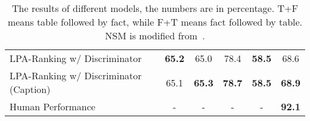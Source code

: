 \documentclass{article} \usepackage{iclr2020_conference,times}
\begin{document}
\begin{table*}[thb]
\begin{tabular}{lccccc}
LPA-Ranking w/ Discriminator          & \textbf{65.2}                    & 65.0                 &  78.4 &    \textbf{58.5}      & 68.6         \\ 
LPA-Ranking w/ Discriminator (Caption)  & 65.1                    & \textbf{65.3}                 &  \textbf{78.7} &    \textbf{58.5}      & \textbf{68.9}         \\ 
\midrule
Human Performance                  &  -                      &      -  &  - & -      & \textbf{92.1}                      \\
\bottomrule
\end{tabular} 
\caption{The results of different models, the numbers are in percentage. T+F means table followed by fact, while F+T means fact followed by table. NSM is modified from~\cite{liang2017neural}.}
\label{tab:result}
\vspace{-3ex}
\end{table*}
\end{document}
